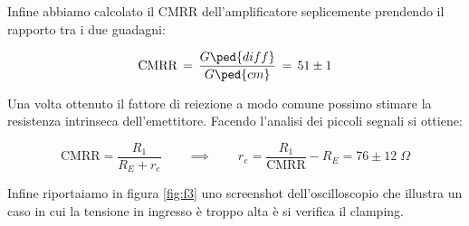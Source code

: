 Infine abbiamo calcolato il CMRR dell'amplificatore seplicemente prendendo il rapporto tra i due guadagni:

\begin{equation}
    \text{CMRR} \,=\,\frac{G\ped{diff}}{G\ped{cm}}\,=\, 51 \pm 1
	\label{eq:cmrr}
\end{equation}


Una volta ottenuto il fattore di reiezione a modo comune possimo stimare la resistenza intrinseca dell'emettitore.
Facendo l'analisi dei piccoli segnali si ottiene:

\begin{equation}
    \text{CMRR} = \frac{R_1}{R_E + r_e} \qquad \implies \qquad r_e = \frac{R_1}{\text{CMRR}} - R_E = 76 \pm 12 \; \Omega
\end{equation}

Infine riportaiamo in figura \ref{fig:f3} uno screenshot dell'oscilloscopio che illustra un caso in cui la tensione in ingresso è troppo alta è
si verifica il clamping.

